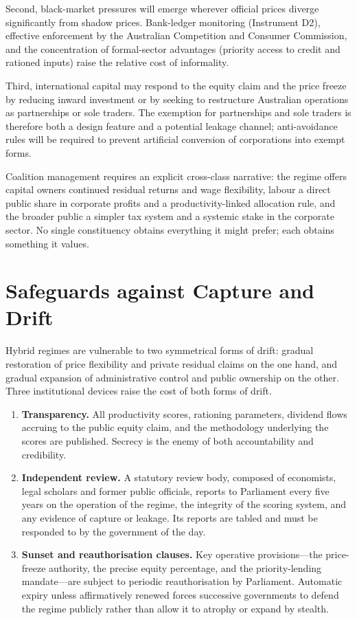 \documentclass[12pt,anyside]{book}
\theoremstyle{definition}
\theoremstyle{plain}
\theoremstyle{remark}
\begin{document}
Second, black-market pressures will emerge wherever official prices diverge significantly from shadow prices. Bank-ledger monitoring (Instrument D2), effective enforcement by the Australian Competition and Consumer Commission, and the concentration of formal-sector advantages (priority access to credit and rationed inputs) raise the relative cost of informality.

Third, international capital may respond to the equity claim and the price freeze by reducing inward investment or by seeking to restructure Australian operations as partnerships or sole traders. The exemption for partnerships and sole traders is therefore both a design feature and a potential leakage channel; anti-avoidance rules will be required to prevent artificial conversion of corporations into exempt forms.

Coalition management requires an explicit cross-class narrative: the regime offers capital owners continued residual returns and wage flexibility, labour a direct public share in corporate profits and a productivity-linked allocation rule, and the broader public a simpler tax system and a systemic stake in the corporate sector. No single constituency obtains everything it might prefer; each obtains something it values.

\section{Safeguards against Capture and Drift}

Hybrid regimes are vulnerable to two symmetrical forms of drift: gradual restoration of price flexibility and private residual claims on the one hand, and gradual expansion of administrative control and public ownership on the other. Three institutional devices raise the cost of both forms of drift.

\begin{enumerate}
\item \textbf{Transparency.} All productivity scores, rationing parameters, dividend flows accruing to the public equity claim, and the methodology underlying the scores are published. Secrecy is the enemy of both accountability and credibility.
\item \textbf{Independent review.} A statutory review body, composed of economists, legal scholars and former public officials, reports to Parliament every five years on the operation of the regime, the integrity of the scoring system, and any evidence of capture or leakage. Its reports are tabled and must be responded to by the government of the day.
\item \textbf{Sunset and reauthorisation clauses.} Key operative provisions—the price-freeze authority, the precise equity percentage, and the priority-lending mandate—are subject to periodic reauthorisation by Parliament. Automatic expiry unless affirmatively renewed forces successive governments to defend the regime publicly rather than allow it to atrophy or expand by stealth.
\end{enumerate}
\end{document}
